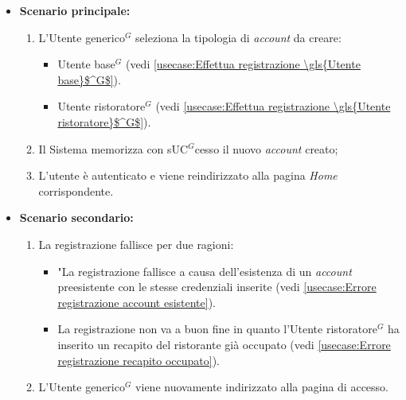 \begin{itemize}
	\item \textbf{Scenario principale:}
	      \begin{enumerate}
		      \item L'\gls{Utente generico}$^G$ seleziona la tipologia di \textit{account} da creare: 
		      \begin{itemize}
				\item \gls{Utente base}$^G$ (vedi \autoref{usecase:Effettua registrazione \gls{Utente base}$^G$}).
				\item \gls{Utente ristoratore}$^G$ (vedi \autoref{usecase:Effettua registrazione \gls{Utente ristoratore}$^G$}).
			  \end{itemize} 
              \item Il Sistema memorizza con s\gls{UC}$^G$cesso il nuovo \textit{account} creato;
		      \item L'utente è autenticato e viene reindirizzato alla pagina \textit{Home} corrispondente.
	      \end{enumerate}
		
    \item \textbf{Scenario secondario:}
                \begin{enumerate}
                    \item La registrazione fallisce per due ragioni:
                    \begin{itemize}
                        \item "La registrazione fallisce a causa dell'esistenza di un \textit{account} preesistente con le stesse credenziali inserite (vedi \autoref{usecase:Errore registrazione account esistente}).
                        \item La registrazione non va a buon fine in quanto l'\gls{Utente ristoratore}$^G$ ha inserito un recapito del ristorante già occupato (vedi \autoref{usecase:Errore registrazione recapito occupato}).
                    \end{itemize}
                    \item L'\gls{Utente generico}$^G$ viene nuovamente indirizzato alla pagina di accesso.
                \end{enumerate}	
          
\end{itemize}